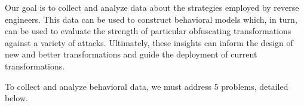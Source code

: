 Our goal is to collect and analyze data about the strategies employed by reverse engineers. This data can be used to construct behavioral models which, in turn, can be used to evaluate the strength of particular obfuscating transformations against a variety of attacks. Ultimately, these insights can inform the design of new and better transformations and guide the deployment of current transformations.

To collect and analyze behavioral data, we must address 5 problems, detailed below.

